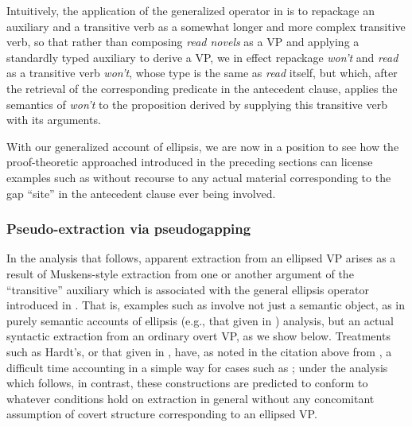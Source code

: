 \documentclass[output=paper,colorlinks,citecolor=brown]{langscibook}
\begin{document}
\noindent Intuitively, the application of the generalized operator in
 is to repackage an auxiliary and a transitive verb as a
somewhat longer and more complex transitive verb, so that rather than
composing \textit{read novels} as a VP and applying a standardly typed
auxiliary to derive a VP, we in effect repackage \textit{won't} and \textit{read} as
a transitive verb \textit{won't}, whose type is the same as \textit{read} itself,
but which, after the retrieval of the corresponding predicate in the
antecedent clause, applies the semantics of \textit{won't} to the proposition
derived by supplying this transitive verb with its arguments.

With our generalized account of ellipsis, we are now in a position to
see how the proof-theoretic approached introduced in the preceding
sections can license examples such as  without
recourse to any actual material corresponding to the gap ``site'' in the
antecedent clause ever being involved.

\subsubsection{Pseudo-extraction via pseudogapping}\label{subsubsec:pseudoextrac}

In the analysis that follows, apparent extraction from an ellipsed VP
arises as a result of Muskens-style extraction from one or another
argument of the ``transitive'' auxiliary which is associated with the
general ellipsis operator introduced in
. That is, examples such as
 involve not just a semantic object, as in purely
semantic accounts of ellipsis (e.g., that given in \citealt{hardt-diss})
analysis, but an actual syntactic extraction from an ordinary overt
VP, as we show below. Treatments such as Hardt's, or that given in
\citet{dalrymple-etal1991}, have, as noted in the citation above from
\citet{Elbourne2008}, a difficult time accounting in a simple way for cases
such as ; under the analysis which follows, in
contrast, these constructions are predicted to conform to whatever
conditions hold on extraction in general without any concomitant
assumption of covert structure corresponding to an ellipsed VP.
\end{document}
